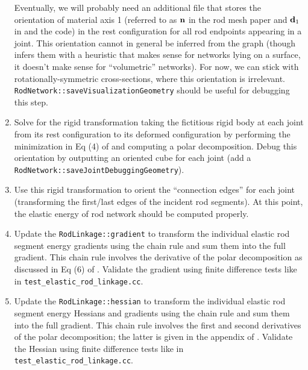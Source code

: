 \documentclass[10pt]{article}
\renewcommand{\vec}[1]{{\bf #1}}
\def\normal{{\bf n}}
\def\n{\normal}
\def\d{\vec{d}}
\begin{document}
\begin{enumerate}
        Eventually, we will probably need an additional file that stores the
        orientation of material axis 1 (referred to as $\n$ in the rod
        mesh paper \cite{Perez2015} and $\d_1$ in \cite{Bergou2010} and the
        code) in the rest configuration for all rod endpoints appearing in a joint.
        This orientation cannot in general be inferred from the graph (though
        \cite{Perez2015} infers them with a heuristic that makes sense for
        networks lying on a surface, it doesn't make sense for ``volumetric''
        networks). For now, we can stick with rotationally-symmetric
        cross-sections, where this orientation is irrelevant.
        \texttt{RodNetwork::saveVisualizationGeometry} should be useful for
        debugging this step.
    \item Solve for the rigid transformation taking the fictitious rigid body
        at each joint from its rest configuration to its deformed configuration
        by performing the minimization in Eq (4) of \cite{Perez2015} and
        computing a polar decomposition. Debug this orientation by outputting
        an oriented cube for each joint (add a
        \texttt{RodNetwork::saveJointDebuggingGeometry}).
    \item Use this rigid transformation to orient the ``connection edges'' for
        each joint (transforming the first/last edges of the incident rod segments).
        At this point, the elastic energy of rod network should be computed properly.
    \item Update the \texttt{RodLinkage::gradient} to transform the individual
        elastic rod segment energy gradients using the chain rule and sum them
        into the full gradient. This chain rule involves the derivative of the polar
        decomposition as discussed in Eq (6) of \cite{Perez2015}.
        Validate the gradient using finite difference tests like in
        \texttt{test\_elastic\_rod\_linkage.cc}.
    \item Update the \texttt{RodLinkage::hessian} to transform the individual
        elastic rod segment energy Hessians and gradients using the chain rule and sum them
        into the full gradient. This chain rule involves the first and second derivatives of the polar
        decomposition; the latter is given in the appendix of \cite{Perez2015}.
        Validate the Hessian using finite difference tests like in
        \texttt{test\_elastic\_rod\_linkage.cc}.
\end{enumerate}
\end{document}
